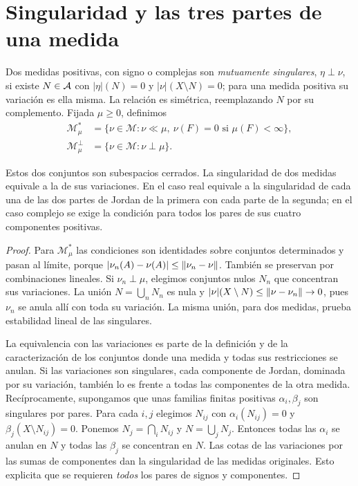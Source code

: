 \section{Singularidad y las tres partes de una medida}\label{lectura:v2-30}
\begin{definicion}
Dos medidas positivas, con signo o complejas son \emph{mutuamente singulares}, $\eta\perp\nu$, si existe $N\in\mathcal A$ con $|\eta|(N)=0$ y $|\nu|(X\setminus N)=0$; para una medida positiva su variación es ella misma. La relación es simétrica, reemplazando $N$ por su complemento. Fijada $\mu\ge0$, definimos
\begin{align*}
 \mathcal M_\mu^*&=\{\nu\in\mathcal M:\nu\ll\mu,\ \nu(F)=0\text{ si }\mu(F)<\infty\},\\
 \mathcal M_\mu^\perp&=\{\nu\in\mathcal M:\nu\perp\mu\}.
\end{align*}
\end{definicion}
\begin{proposicion}\label{v2:singulares-cerrados}
Estos dos conjuntos son subespacios cerrados. La singularidad de dos medidas equivale a la de sus variaciones. En el caso real equivale a la singularidad de cada una de las dos partes de Jordan de la primera con cada parte de la segunda; en el caso complejo se exige la condición para todos los pares de sus cuatro componentes positivas.
\end{proposicion}
\begin{proof}
Para $\mathcal M_\mu^*$ las condiciones son identidades sobre conjuntos determinados y pasan al límite, porque $|\nu_n(A)-\nu(A)|\le\left\lVert\nu_n-\nu\right\rVert$. También se preservan por combinaciones lineales. Si $\nu_n\perp\mu$, elegimos conjuntos nulos $N_n$ que concentran sus variaciones. La unión $N=\bigcup_nN_n$ es nula y $|\nu|(X\setminus N)\le\left\lVert\nu-\nu_n\right\rVert\to0$, pues $\nu_n$ se anula allí con toda su variación. La misma unión, para dos medidas, prueba estabilidad lineal de las singulares.

La equivalencia con las variaciones es parte de la definición y de la caracterización de los conjuntos donde una medida y todas sus restricciones se anulan. Si las variaciones son singulares, cada componente de Jordan, dominada por su variación, también lo es frente a todas las componentes de la otra medida. Recíprocamente, supongamos que unas familias finitas positivas $\alpha_i,\beta_j$ son singulares por pares. Para cada $i,j$ elegimos $N_{ij}$ con $\alpha_i(N_{ij})=0$ y $\beta_j(X\setminus N_{ij})=0$. Ponemos $N_j=\bigcap_iN_{ij}$ y $N=\bigcup_jN_j$. Entonces todas las $\alpha_i$ se anulan en $N$ y todas las $\beta_j$ se concentran en $N$. Las cotas de las variaciones por las sumas de componentes dan la singularidad de las medidas originales. Esto explicita que se requieren \emph{todos} los pares de signos y componentes.
\end{proof}
